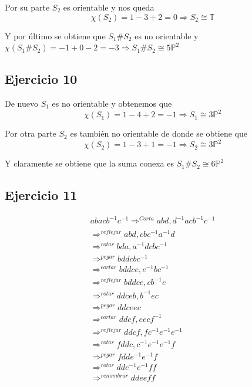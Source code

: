 \documentclass{article}
\begin{document}
Por su parte $S_2$ es orientable y nos queda
\begin{equation*}
\chi(S_2)=1-3+2=0\Rightarrow S_2\cong \mathbb{T}
\end{equation*}

Y por último se obtiene que $S_1\#S_2$ es no orientable y $\chi(S_1\#S_2)=-1+0-2=-3\Rightarrow S_1\#S_2\cong 5\mathbb{P}^2$

\subsection{Ejercicio 10}
De nuevo $S_1$ es no orientable y obtenemos que
\begin{equation*}
\chi(S_1)=1-4+2=-1\Rightarrow S_1\cong 3\mathbb{P}^2
\end{equation*}

Por otra parte $S_2$ es también no orientable de donde se obtiene que
\begin{equation*}
\chi(S_2)=1-3+1=-1\Rightarrow S_2\cong 3\mathbb{P}^2
\end{equation*}

Y claramente se obtiene que la suma conexa es $S_1\#S_2\cong 6\mathbb{P}^2$

\subsection{Ejercicio 11}
\begin{gather*}
abacb^{-1}c^{-1}\Rightarrow^{Corta} abd, d^{-1}acb^{-1}c^{-1}\\
\Rightarrow^{reflejar}abd, cbc^{-1}a^{-1}d\\
\Rightarrow^{rotar}bda, a^{-1}dcbc^{-1}\\
\Rightarrow^{pegar}bddcbc^{-1} \\
\Rightarrow^{cortar}bddce, e^{-1}bc^{-1}\\
\Rightarrow^{reflejar}bddce, cb^{-1}e\\
\Rightarrow^{rotar}ddceb,b^{-1}ec\\
\Rightarrow^{pegar}ddceec\\
\Rightarrow^{cortar}ddcf, eecf^{-1}\\
\Rightarrow^{reflejar}ddcf,fc^{-1}e^{-1}e^{-1}\\
\Rightarrow^{rotar}fddc,c^{-1}e^{-1}e^{-1}f\\
\Rightarrow^{pegar}fdde^{-1}e^{-1}f\\
\Rightarrow^{rotar}dde^{-1}e^{-1}ff\\
\Rightarrow^{renombrar}ddeeff
\end{gather*}
\end{document}
